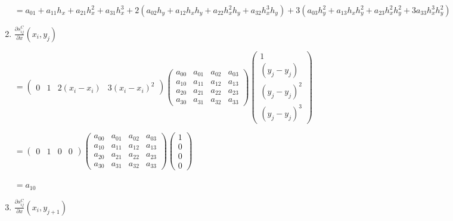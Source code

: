 \documentclass[11pt]{article}
\begin{document}
\begin{enumerate}[label=\textbf{\arabic*)}]
\begin{flushleft}
    $=  a_{01} + a_{11}h_x + a_{21}h_x^2 + a_{31}h_x^3 + 2(a_{02}h_y + a_{12}h_xh_y + a_{22}h_x^2h_y + a_{32}h_x^3h_y) + 3(a_{03}h_y^2 + a_{13}h_xh_y^2 + a_{23}h_x^2h_y^2 + 3a_{33}h_x^3h_y^2)$
    \end{flushleft}

    \item $\frac{\partial s_{ij}^C}{\partial x}(x_i, y_j)$

    \begin{flushleft}
    $= \begin{pmatrix}
      0 & 1 & 2(x_i - x_i) & 3(x_i - x_i)^2
    \end{pmatrix}
    \begin{pmatrix}
      a_{00}  & a_{01} & a_{02} & a_{03} \\
      a_{10}  & a_{11} & a_{12} & a_{13} \\
      a_{20}  & a_{21} & a_{22} & a_{23} \\
      a_{30}  & a_{31} & a_{32} & a_{33}
    \end{pmatrix}
    \begin{pmatrix}
      1  \\
      (y_j - y_j) \\
      (y_j - y_j)^2  \\
      (y_j - y_j)^3
    \end{pmatrix}$


    $= \begin{pmatrix}
      0 & 1 & 0 & 0
    \end{pmatrix}
    \begin{pmatrix}
      a_{00}  & a_{01} & a_{02} & a_{03} \\
      a_{10}  & a_{11} & a_{12} & a_{13} \\
      a_{20}  & a_{21} & a_{22} & a_{23} \\
      a_{30}  & a_{31} & a_{32} & a_{33}
    \end{pmatrix}
    \begin{pmatrix}
      1  \\
      0  \\
      0  \\
      0
    \end{pmatrix}$

    $= a_{10}$
    \end{flushleft}

    \item $\frac{\partial s_{ij}^C}{\partial x}(x_i, y_{j + 1})$


\end{enumerate}
\end{document}
